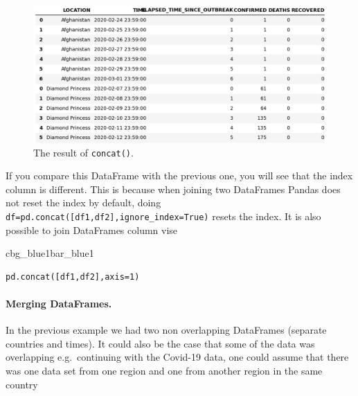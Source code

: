 \documentclass[%
oneside,                 %
final,                   %
10pt]{article}
\newenvironment{_pro_tight}[2]{
   \def\FrameCommand{\color{#2}\vrule width 1mm\normalcolor\colorbox{#1}}
   \FrameRule0.6pt\MakeFramed {\advance\hsize-2mm\FrameRestore}\vskip3mm}
   {\vskip0mm\endMakeFramed}
\newenvironment{pro}[2]{
\bgroup\rmfamily
\fboxsep=0mm\relax
\begin{_pro_tight}{#1}{#2}
\list{}{\parsep=-2mm\parskip=0mm\topsep=0pt\leftmargin=2mm
\rightmargin=2\leftmargin\leftmargin=4pt\relax}
\item\relax}
{\endlist\end{_pro_tight}\egroup}
\begin{document}
\begin{figure}[!ht]  %
  \centerline{\includegraphics[width=1.0\linewidth]{fig-pandas/concat.png}}
  \caption{
  The result of \texttt{concat()}. \label{fig:pandas:concat}
  }
\end{figure}

If you compare this DataFrame with the previous one, you will see that the index column is different. This is because when joining two DataFrames Pandas does not reset the index by default, doing \Verb!df=pd.concat([df1,df2],ignore_index=True)! resets the index. It is also possible to join DataFrames column vise


\begin{pro}{cbg_blue1}{bar_blue1}\begin{Verbatim}[numbers=none,fontsize=\fontsize{9pt}{9pt},baselinestretch=0.95,xleftmargin=2mm]
pd.concat([df1,df2],axis=1)

\end{Verbatim}
\end{pro}
\noindent


\paragraph{Merging DataFrames.}
In the previous example we had two non overlapping DataFrames (separate countries and times). It could also be the case that some of the data was overlapping e.g.~continuing with the Covid-19 data, one could assume that there was one data set from one region and one from another region in the same country
\end{document}
